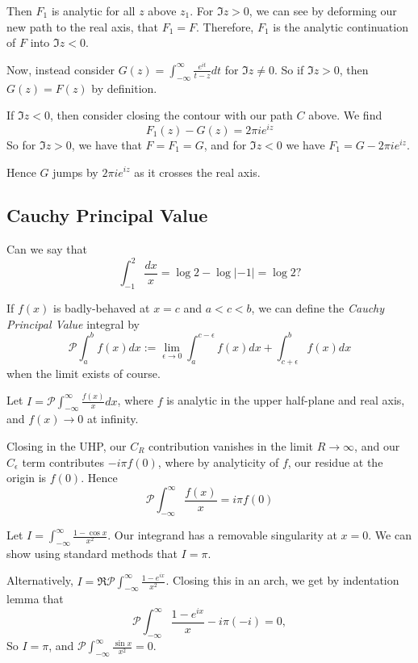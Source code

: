 \documentclass[a4paper]{article}
\begin{document}
\begin{enumerate}
\begin{eg}
		Then $F_1$ is analytic for all $z$ above $z_1$. For $\Im z > 0$, we can see by deforming our new path to the real axis, that $F_1 = F$. Therefore, $F_1$ is the analytic continuation of $F$ into $\Im z < 0$.

		Now, instead consider $G(z) = \int_{-\infty}^{\infty} \frac{e^{it}}{t-z} dt$ for $\Im z \neq 0$. So if  $\Im z > 0$, then $G(z) = F(z)$ by definition.

		If $\Im z < 0$, then consider closing the contour with our path $C$ above. We find \[
			F_1(z) - G(z) = 2\pi i e^{iz} 
		\]
		So for $\Im z > 0$, we have that $F = F_1 = G$, and for $\Im z < 0$ we have  $F_1 = G- 2\pi i e^{iz}$. 

		Hence $G$ jumps by $2\pi i e^{iz}$ as it crosses the real axis.
		\end{eg}
\end{enumerate}

\subsection{Cauchy Principal Value}

\begin{idea}
	Can we say that \[
	\int_{-1}^{2} \frac{dx}{x} = \log 2 - \log|-1| = \log 2
	?\] 
\end{idea}

\begin{defn}
	If $f(x)$ is badly-behaved at $x=c$ and $a<c<b$, we can define the \textit{Cauchy Principal Value} integral by
	\[
		\mathcal{P} \int_a^{b} f(x) dx := \lim_{\epsilon \to 0} \int_{a}^{c-\epsilon} f(x) dx + \int_{c + \epsilon}^{b} f(x) dx
	\]
	when the limit exists of course.
\end{defn}

\begin{eg}
	Let $I = \mathcal{P} \int_{-\infty}^{\infty} \frac{f(x)}{x} dx$, where $f$ is analytic  in the upper half-plane and real axis, and $f(x) \to 0$ at infinity.

	Closing in the UHP, our $C_R$ contribution vanishes in the limit $R\to \infty$, and our $C_{\epsilon}$ term contributes $-i\pi f(0)$, where by analyticity of $f$, our residue at the origin is $f(0)$.
	Hence
	\[
		\mathcal{P} \int_{-\infty}^{\infty} \frac{f(x)}{x} = i\pi f(0)
	\] 
\end{eg}

\begin{eg}
	Let $I = \int_{-\infty}^{\infty} \frac{1-\cos x}{x^2}$. Our integrand has a removable singularity at $x=0$. We can show using standard methods that  $I = \pi$.

	Alternatively, $I = \Re \mathcal{P} \int_{-\infty}^{\infty} \frac{1-e^{ix}}{x^2}$. Closing this in an arch, we get by indentation lemma that
	\[
		\mathcal{P}\int_{-\infty}^{\infty} \frac{1-e^{ix}}{x} -i\pi (-i) = 0
	,\]
	So $I=\pi$, and $\mathcal{P} \int_{-\infty}^{\infty} \frac{\sin x}{x^2} = 0$.
\end{eg}
\end{document}
